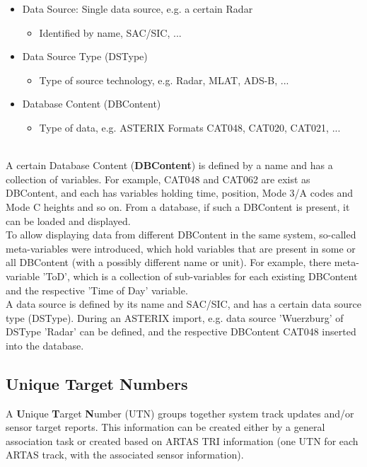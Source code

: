 \begin{itemize}  
    \item Data Source: Single data source, e.g. a certain Radar
    \begin{itemize}  
        \item Identified by name, SAC/SIC, ...
    \end{itemize}
    \item Data Source Type (DSType)
    \begin{itemize}  
        \item Type of source technology, e.g. Radar, MLAT, ADS-B, ...
    \end{itemize}    
    \item Database Content (DBContent)
    \begin{itemize}  
        \item Type of data, e.g. ASTERIX Formats CAT048, CAT020, CAT021, ...
    \end{itemize}        
\end{itemize}
\ \\

A certain Database Content (\textbf{DBContent}) is defined by a name and has a collection of variables. For example, CAT048 and CAT062 are exist as DBContent, and each has variables holding time, position, Mode 3/A codes and Mode C heights and so on. From a database, if such a DBContent is present, it can be loaded and displayed.\\

To allow displaying data from different DBContent in the same system, so-called meta-variables were introduced, which hold variables that are present in some or all DBContent (with a possibly different name or unit).  For example, there meta-variable 'ToD', which is a collection of sub-variables for each existing DBContent and the respective 'Time of Day' variable. \\

A data source is defined by its name and SAC/SIC, and has a certain data source type (DSType). During an ASTERIX import, e.g. data source 'Wuerzburg' of DSType 'Radar' can be defined, and the respective DBContent CAT048 inserted into the database.


\subsection*{Unique Target Numbers}
A \textbf{U}nique \textbf{T}arget \textbf{N}umber (UTN) groups together system track updates and/or sensor target reports.
This information can be created either by a general association task or created based on ARTAS TRI information (one UTN for each ARTAS track, with the associated sensor information).

